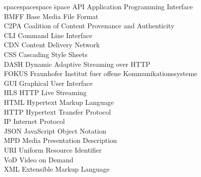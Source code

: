 
\begin{tabbing}
spacespacespace \= space \kill
API	    \> 	    Application Programming Interface	 \\
BMFF    \>      Base Media File Format \\
C2PA    \>      Coalition of Content Provenance and Authenticity \\
CLI     \>      Command Line Interface \\
CDN     \>      Content Delivery Network \\
CSS	    \>	    Cascading Style Sheets \\
DASH    \>      Dynamic Adaptive Streaming over HTTP \\
FOKUS	\>	    Fraunhofer Institut fuer offene Kommunikationssysteme \\
GUI	    \>	    Graphical User Interface \\
HLS     \>      HTTP Live Streaming \\
HTML	\>	    Hypertext Markup Language \\
HTTP	\>      Hypertext Transfer Protocol	 \\
IP	    \> 	    Internet Protocol	 \\
JSON	\>	    JavaScript Object Notation \\
MPD     \>      Media Presentation Description \\
URI	    \> 	    Uniform Resource Identifier	 \\
VoD     \>      Video on Demand \\
XML	    \> 	    Extensible Markup Language	 \\
\end{tabbing}
\endinput

